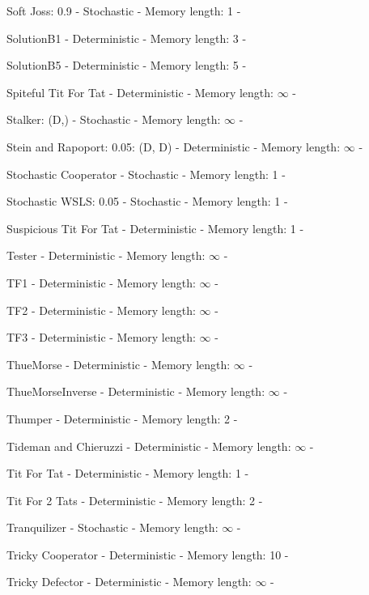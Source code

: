 \item Soft Joss: 0.9 - Stochastic - Memory length: 1 - \cite{Prison1998}
\item SolutionB1 - Deterministic - Memory length: 3 - \cite{Ashlock2015}
\item SolutionB5 - Deterministic - Memory length: 5 - \cite{Ashlock2015}
\item Spiteful Tit For Tat - Deterministic - Memory length: \(\infty\) - \cite{Prison1998}
\item Stalker: (D,) - Stochastic - Memory length: \(\infty\) - \cite{Andre2013}
\item Stein and Rapoport: 0.05: (D, D) - Deterministic - Memory length: \(\infty\) - \cite{Axelrod1980}
\item Stochastic Cooperator - Stochastic - Memory length: 1 - \cite{Adami2013}
\item Stochastic WSLS: 0.05 - Stochastic - Memory length: 1 - \cite{Amaral2016}
\item Suspicious Tit For Tat - Deterministic - Memory length: 1 - \cite{Beaufils1997, Hilbe2013}
\item Tester - Deterministic - Memory length: \(\infty\) - \cite{Axelrod1980b}
\item TF1 - Deterministic - Memory length: \(\infty\) - \cite{Knight2018}
\item TF2 - Deterministic - Memory length: \(\infty\) - \cite{Knight2018}
\item TF3 - Deterministic - Memory length: \(\infty\) - \cite{Knight2018}
\item ThueMorse - Deterministic - Memory length: \(\infty\) - \cite{Knight2018}
\item ThueMorseInverse - Deterministic - Memory length: \(\infty\) - \cite{Knight2018}
\item Thumper - Deterministic - Memory length: 2 - \cite{Ashlock2008}
\item Tideman and Chieruzzi - Deterministic - Memory length: \(\infty\) - \cite{Axelrod1980}
\item Tit For Tat - Deterministic - Memory length: 1 - \cite{Axelrod1980}
\item Tit For 2 Tats - Deterministic - Memory length: 2 - \cite{Axelrod1984}
\item Tranquilizer - Stochastic - Memory length: \(\infty\) - \cite{Axelrod1980}
\item Tricky Cooperator - Deterministic - Memory length: 10 - \cite{Knight2018}
\item Tricky Defector - Deterministic - Memory length: \(\infty\) - \cite{Knight2018}
